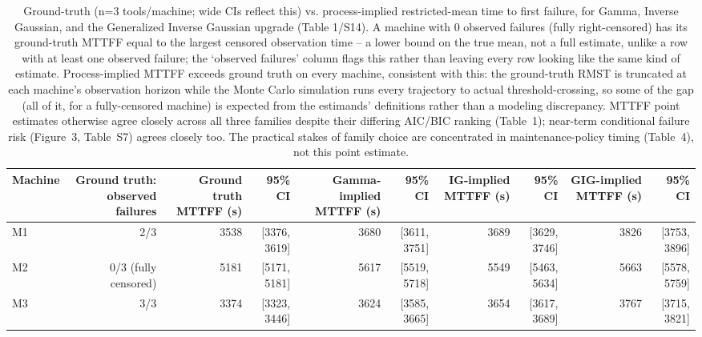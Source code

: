 \begin{table}[t]
\centering
\caption{Ground-truth (n=3 tools/machine; wide CIs reflect this) vs. process-implied restricted-mean time to first failure, for Gamma, Inverse Gaussian, and the Generalized Inverse Gaussian upgrade (Table 1/S14). A machine with 0 observed failures (fully right-censored) has its ground-truth MTTFF equal to the largest censored observation time -- a lower bound on the true mean, not a full estimate, unlike a row with at least one observed failure; the `observed failures' column flags this rather than leaving every row looking like the same kind of estimate. Process-implied MTTFF exceeds ground truth on every machine, consistent with this: the ground-truth RMST is truncated at each machine's observation horizon while the Monte Carlo simulation runs every trajectory to actual threshold-crossing, so some of the gap (all of it, for a fully-censored machine) is expected from the estimands' definitions rather than a modeling discrepancy. MTTFF point estimates otherwise agree closely across all three families despite their differing AIC/BIC ranking (Table~1); near-term conditional failure risk (Figure~3, Table~S7) agrees closely too. The practical stakes of family choice are concentrated in maintenance-policy timing (Table~4), not this point estimate.}
\label{tab:reliability-translation}
\begin{tabular}{lrrrrrrrrr}
\toprule
Machine & Ground truth: observed failures & Ground truth MTTFF (s) & 95\% CI & Gamma-implied MTTFF (s) & 95\% CI & IG-implied MTTFF (s) & 95\% CI & GIG-implied MTTFF (s) & 95\% CI \\
\midrule
M1 & 2/3 & 3538 & [3376, 3619] & 3680 & [3611, 3751] & 3689 & [3629, 3746] & 3826 & [3753, 3896] \\
M2 & 0/3 (fully censored) & 5181 & [5171, 5181] & 5617 & [5519, 5718] & 5549 & [5463, 5634] & 5663 & [5578, 5759] \\
M3 & 3/3 & 3374 & [3323, 3446] & 3624 & [3585, 3665] & 3654 & [3617, 3689] & 3767 & [3715, 3821] \\
\bottomrule
\end{tabular}
\end{table}
